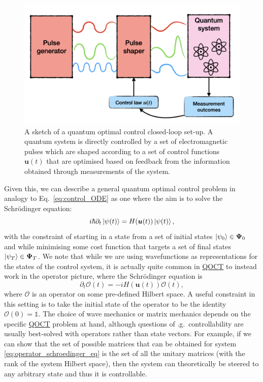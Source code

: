 \documentclass[a4paper,oneside,11pt]{book}
\newcommand{\ubb}{\boldsymbol{u}}
\newcommand{\acrref}[1]{\hyperref[acr:#1]{#1}}
\begin{document}
\begin{figure}[t]
\centering
\includegraphics[width=0.8\linewidth]{images/optimal_control_placeholder.png} \caption[Schematic diagram of open-loop quantum optimal control]{A sketch of a quantum optimal control closed-loop set-up. A quantum system is directly controlled by a set of electromagnetic pulses which are shaped according to a set of control functions $\ubb(t)$ that are optimised based on feedback from the information obtained through measurements of the system.}\label{fig:quantum_optimal_control}
\end{figure}

Given this, we can describe a general quantum optimal control problem in analogy to Eq.~\eqref{eq:control_ODE} as one where the aim is to solve the Schr\"{o}dinger equation:
\begin{equation}\label{eq:optimal_control_schroedinger}
    i \hbar \partial_t \ket{\psi(t)} = H(\ubb(t))\ket{\psi(t)},
\end{equation}
with the constraint of starting in a state from a set of initial states $\ket{\psi_0} \in \boldsymbol \Psi_0$ and while minimising some cost function that targets a set of final states $\ket{\psi_T} \in \boldsymbol \Psi_T$. We note that while we are using wavefunctions as representations for the states of the control system, it is actually quite common in \acrref{QOCT} to instead work in the operator picture, where the Schr\"{o}dinger equation is
\begin{equation}\label{eq:operator_schroedinger_eq}
    \partial_t \mathcal{O}(t) = -i H(\ubb(t))\mathcal{O}(t),
\end{equation}
where $\mathcal{O}$ is an operator on some pre-defined Hilbert space. A useful constraint in this setting is to take the initial state of the operator to be the identity $\mathcal{O}(0) = \mathds{1}$. The choice of wave mechanics or matrix mechanics depends on the specific \acrref{QOCT} problem at hand, although questions of \@e.g.~controllability are usually best-solved with operators rather than state vectors. For example, if we can show that the set of possible matrices that can be obtained for system \eqref{eq:operator_schroedinger_eq} is the set of all the unitary matrices (with the rank of the system Hilbert space), then the system can theoretically be steered to any arbitrary state and thus it is controllable.
\end{document}
